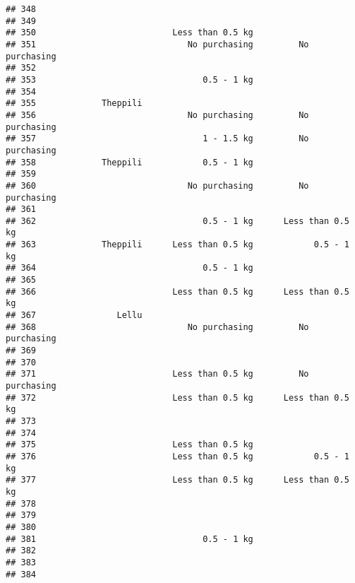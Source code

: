\documentclass[
]{article}
\begin{document}
\begin{verbatim}
## 348                                                                 
## 349                                                                 
## 350                           Less than 0.5 kg                      
## 351                              No purchasing         No purchasing
## 352                                                                 
## 353                                 0.5 - 1 kg                      
## 354                                                                 
## 355             Theppili                                            
## 356                              No purchasing         No purchasing
## 357                                 1 - 1.5 kg         No purchasing
## 358             Theppili            0.5 - 1 kg                      
## 359                                                                 
## 360                              No purchasing         No purchasing
## 361                                                                 
## 362                                 0.5 - 1 kg      Less than 0.5 kg
## 363             Theppili      Less than 0.5 kg            0.5 - 1 kg
## 364                                 0.5 - 1 kg                      
## 365                                                                 
## 366                           Less than 0.5 kg      Less than 0.5 kg
## 367                Lellu                                            
## 368                              No purchasing         No purchasing
## 369                                                                 
## 370                                                                 
## 371                           Less than 0.5 kg         No purchasing
## 372                           Less than 0.5 kg      Less than 0.5 kg
## 373                                                                 
## 374                                                                 
## 375                           Less than 0.5 kg                      
## 376                           Less than 0.5 kg            0.5 - 1 kg
## 377                           Less than 0.5 kg      Less than 0.5 kg
## 378                                                                 
## 379                                                                 
## 380                                                                 
## 381                                 0.5 - 1 kg                      
## 382                                                                 
## 383                                                                 
## 384                                                                 

\end{verbatim}
\end{document}
